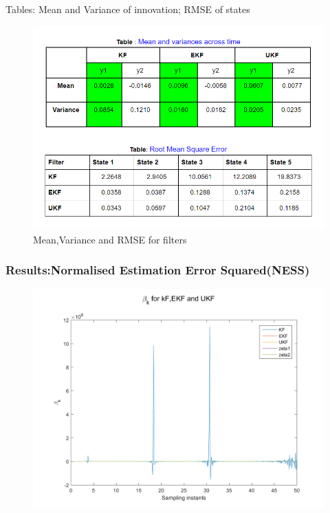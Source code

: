 \documentclass{beamer}
\begin{document}
\begin{frame}{Tables: Mean and Variance of innovation; RMSE of states}
    \begin{figure}
        \centering
        \includegraphics[width=0.8\linewidth]{plots/tables.PNG}
        \caption{Mean,Variance and RMSE for filters}
        \label{fig:my_label}
    \end{figure}
\end{frame}
\begin{frame}
\frametitle{Results:Normalised Estimation Error Squared(NESS)}
\begin{figure}
\includegraphics[width=0.8\linewidth]{plots/betak_all.png}
\end{figure}
\end{frame}
\end{document}
